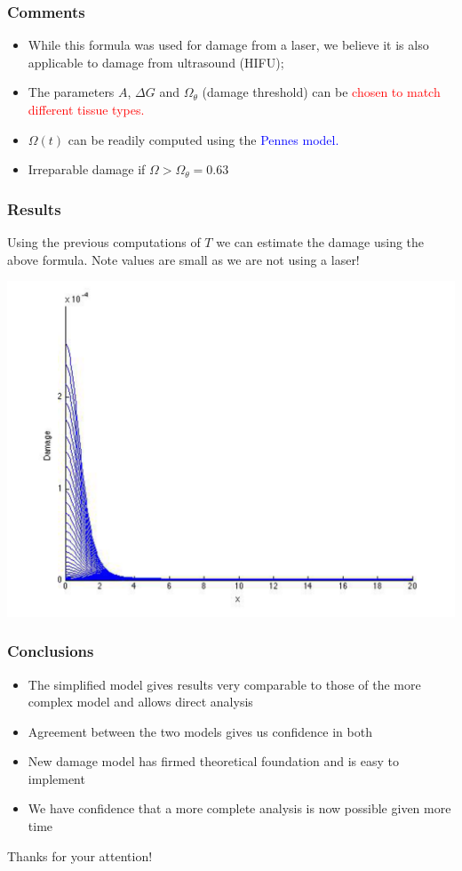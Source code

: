 \documentclass{beamer}
\begin{document}
\begin{frame}
\frametitle{Comments}
\begin{itemize}
\item While this formula was used for damage from a laser, we believe it is also applicable to damage from ultrasound (HIFU);
\item The parameters $A$, $\Delta G$ and $\Omega_\theta$ (damage threshold) can be \textcolor{red}{chosen to match different tissue types.}
\item $\Omega(t)$ can be readily computed using the \textcolor{blue}{Pennes model.}
\item Irreparable damage if $\Omega > \Omega_{\theta} = 0.63$
\end{itemize}
 
\end{frame}

\begin{frame}
\frametitle{Results}
Using the previous computations of $T$ we can estimate the damage using the above formula. Note values are small as we are not using a laser!
\begin{center}
\includegraphics[scale=0.36]{Pages/Damage_Jessica.pdf}
\end{center}
\end{frame}

\begin{frame}
\frametitle{Conclusions}
\begin{itemize}
\item{The simplified model gives results very comparable to those of the more complex model and allows direct analysis}
\item{Agreement between the two models gives us confidence in both}
\item{New damage model has firmed theoretical foundation and is easy to implement}
\item{We have confidence that a more complete analysis is now possible given more time}
\end{itemize}
\end{frame}

\begin{frame}
\centerline{\large{Thanks for your attention!}}
\end{frame}
\end{document}
